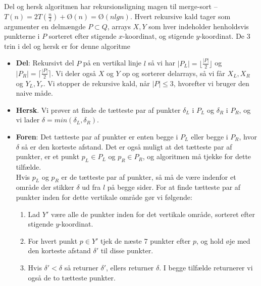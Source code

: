 Del og hersk algoritmen har rekursionsligning magen til merge-sort -- $T(n)=2T(\frac{n}{2}) + Ø(n) = Ø(nlgn)$. Hvert rekursive kald tager som argumenter en delmængde $P \subset Q$, arrays $X,Y$ som hver indeholder henholdsvis punkterne i $P$ sorteret efter stigende $x$-koordinat, og stigende $y$-koordinat. De 3 trin i del og hersk er for denne algoritme
\begin{itemize}
\item \textbf{Del}: Rekursivt del $P$ på en vertikal linje $l$ så vi har $|P_L| = \lfloor \frac{|P|}{2}\rfloor$ og $|P_R| = \lceil \frac{|P|}{2}\rceil$. Vi deler også $X$ og $Y$ op og sorterer delarrays, så vi får $X_L, X_R$ og $Y_L,Y_r$. Vi stopper de rekursive kald, når $|P| \leq 3$, hvorefter vi bruger den naive måde.
\item \textbf{Hersk}. Vi prøver at finde de tætteste par af punkter $\delta_L$ i $P_L$ og $\delta_R$ i $P_R$, og vi lader $\delta = min(\delta_L, \delta_R)$.
\item \textbf{Foren}: Det tætteste par af punkter er enten begge i $P_L$ eller begge i $P_R$, hvor $\delta$ så er den korteste afstand. Det er også muligt at det tætteste par af punkter, er et punkt $p_L \in P_L$ og $p_R \in P_R$, og algoritmen må tjekke for dette tilfælde.\\

  Hvis $p_L$ og $p_R$ er de tætteste par af punkter, så må de være indenfor et område der stikker $\delta$ ud fra $l$ på begge sider. For at finde tætteste par af punkter inden for dette vertikale område gør vi følgende:
  \begin{enumerate}
  \item Lad $Y'$ være alle de punkter inden for det vertikale område, sorteret efter stigende $y$-koordinat.
  \item For hvert punkt $p \in Y'$ tjek de næste 7 punkter efter $p$, og hold øje med den korteste afstand $\delta'$ til disse punkter.
  \item Hvis $\delta' < \delta$ så returner $\delta'$, ellers returner $\delta$. I begge tilfælde returnerer vi også de to tætteste punkter.
  \end{enumerate}
\end{itemize}

